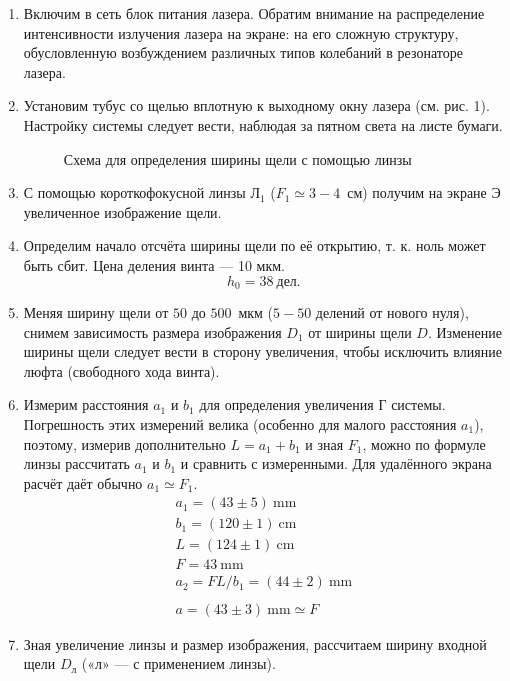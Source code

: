 \begin{enumerate}

    \item 
    Включим в сеть блок питания лазера. Обратим внимание на распределение интенсивности излучения лазера на экране: на его сложную структуру, обусловленную возбуждением различных типов колебаний в резонаторе лазера.
    
    \item
    Установим тубус со щелью вплотную к выходному окну лазера (см. рис. 1). Настройку системы следует вести, наблюдая за пятном света на листе бумаги.
    
    \begin{figure}[h]
    \caption{Схема для определения ширины щели с помощью линзы}
    \end{figure}
    
    \item
    С помощью короткофокусной линзы $\text{Л}_1$ ($F_1 \simeq 3-4$~см) получим на экране Э увеличенное изображение щели.
    
    \item
    Определим начало отсчёта ширины щели по её открытию, т. к. ноль может быть сбит. Цена деления винта — 10 мкм.
    $$ h_0 = 38~\text{дел}.$$
    
    \item
    Меняя ширину щели от $50$ до $500$~мкм ($5-50$ делений от нового нуля), снимем зависимость размера изображения $D_1$ от ширины щели $D$. Изменение ширины щели следует вести в сторону увеличения, чтобы исключить влияние люфта (свободного хода винта).
    
    \item 
    Измерим расстояния $a_1$ и $b_1$ для определения увеличения $\text{Г}$ системы. Погрешность этих измерений велика (особенно для малого расстояния $a_1$), поэтому, измерив дополнительно $L = a_1 + b_1$ и зная $F_1$, можно по формуле линзы рассчитать $a_1$ и $b_1$ и сравнить с измеренными. Для удалённого экрана расчёт даёт обычно $a_1 \simeq F_1$.
    \begin{gather*}
        a_1 = (43 \pm 5)~\text{mm}\\
        b_1 = (120 \pm 1)~\text{cm}\\
        L = (124 \pm 1)~\text{cm}\\
        F = 43~\text{mm}\\
        a_2 = FL/b_1 = (44 \pm 2)~\text{mm}\\
        \\
        a = (43 \pm 3)~\text{mm} \simeq F
    \end{gather*}
    
    \item
    Зная увеличение линзы и размер изображения, рассчитаем ширину входной щели $D_{\text{л}}$ («л» — с применением линзы).
        
\end{enumerate}

